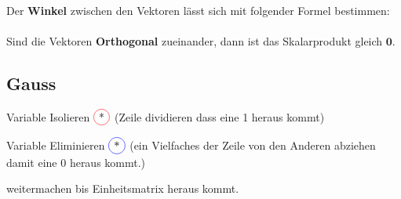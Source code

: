 Der \textbf{Winkel} zwischen den Vektoren lässt sich mit folgender Formel bestimmen:\\
\\[5pt]
Sind die Vektoren \textbf{Orthogonal} zueinander, dann ist das Skalarprodukt gleich $\mathbf{0}$.



\subsection{Gauss}
\begin{compactenum}
	\item Variable Isolieren $\circledr{*}$ (Zeile dividieren dass eine 1 heraus kommt)
	\item Variable Eliminieren $\circledb{*}$ (ein Vielfaches der Zeile von den Anderen abziehen damit eine 0 heraus kommt.)
	\item weitermachen bis Einheitsmatrix heraus kommt.
\end{compactenum}

